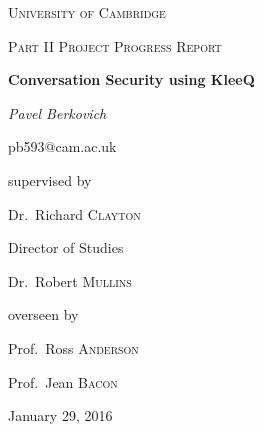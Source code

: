 \documentclass[12pt,a4paper]{report}
\begin{document}
\begin{titlepage}
	\centering
	{\scshape\LARGE University of Cambridge\par}
	\vspace{1cm}
	{\scshape\Large Part II Project Progress Report\par}
	\vspace{1.5cm}
	{\huge\bfseries Conversation Security using KleeQ \par}
	\vspace{2cm}
	{\Large\itshape Pavel Berkovich\par 
	\small pb593@cam.ac.uk}
	
	\vfill
	supervised by\par
	Dr.~Richard \textsc{Clayton}
	
	\vspace{1cm}
	Director of Studies\par
	Dr.~Robert \textsc{Mullins}
	
	\vspace{1cm}
	overseen by\par
	Prof.~Ross \textsc{Anderson}\par
	Prof.~Jean \textsc{Bacon}
	

	\vspace{1cm}

	{\large January 29, 2016 \par}
\end{titlepage}
\end{document}
